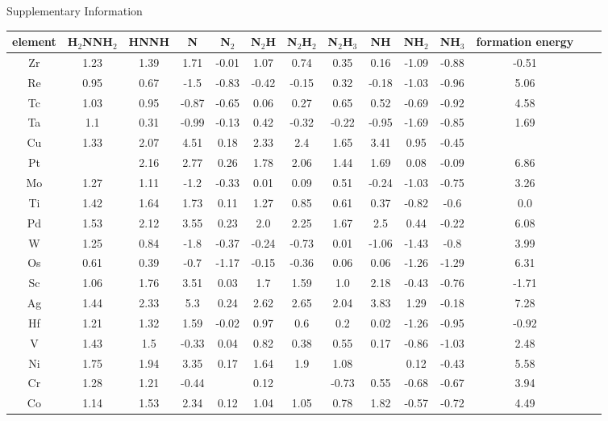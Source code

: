 Supplementary Information
\onecolumn
\begin{center}
\begin{tabular}{| c | c | c | c | c | c | c | c | c | c | c | c | c | c |}
\hline
element & H$_2$NNH$_2$ & HNNH & N & N$_2$ & N$_2$H & N$_2$H$_2$ & N$_2$H$_3$ & NH & NH$_2$ & NH$_3$ & formation energy\\
\hline

Zr & 1.23 & 1.39 & 1.71 & -0.01 & 1.07 & 0.74 & 0.35 & 0.16 & -1.09 & -0.88 & -0.51 \\
Re & 0.95 & 0.67 & -1.5 & -0.83 & -0.42 & -0.15 & 0.32 & -0.18 & -1.03 & -0.96 & 5.06 \\
Tc & 1.03 & 0.95 & -0.87 & -0.65 & 0.06 & 0.27 & 0.65 & 0.52 & -0.69 & -0.92 & 4.58 \\
Ta & 1.1 & 0.31 & -0.99 & -0.13 & 0.42 & -0.32 & -0.22 & -0.95 & -1.69 & -0.85 & 1.69 \\
Cu & 1.33 & 2.07 & 4.51 & 0.18 & 2.33 & 2.4 & 1.65 & 3.41 & 0.95 & -0.45 &  \\
Pt &  & 2.16 & 2.77 & 0.26 & 1.78 & 2.06 & 1.44 & 1.69 & 0.08 & -0.09 & 6.86 \\
Mo & 1.27 & 1.11 & -1.2 & -0.33 & 0.01 & 0.09 & 0.51 & -0.24 & -1.03 & -0.75 & 3.26 \\
Ti & 1.42 & 1.64 & 1.73 & 0.11 & 1.27 & 0.85 & 0.61 & 0.37 & -0.82 & -0.6 & 0.0 \\
Pd & 1.53 & 2.12 & 3.55 & 0.23 & 2.0 & 2.25 & 1.67 & 2.5 & 0.44 & -0.22 & 6.08 \\
W & 1.25 & 0.84 & -1.8 & -0.37 & -0.24 & -0.73 & 0.01 & -1.06 & -1.43 & -0.8 & 3.99 \\
Os & 0.61 & 0.39 & -0.7 & -1.17 & -0.15 & -0.36 & 0.06 & 0.06 & -1.26 & -1.29 & 6.31 \\
Sc & 1.06 & 1.76 & 3.51 & 0.03 & 1.7 & 1.59 & 1.0 & 2.18 & -0.43 & -0.76 & -1.71 \\
Ag & 1.44 & 2.33 & 5.3 & 0.24 & 2.62 & 2.65 & 2.04 & 3.83 & 1.29 & -0.18 & 7.28 \\
Hf & 1.21 & 1.32 & 1.59 & -0.02 & 0.97 & 0.6 & 0.2 & 0.02 & -1.26 & -0.95 & -0.92 \\
V & 1.43 & 1.5 & -0.33 & 0.04 & 0.82 & 0.38 & 0.55 & 0.17 & -0.86 & -1.03 & 2.48 \\
Ni & 1.75 & 1.94 & 3.35 & 0.17 & 1.64 & 1.9 & 1.08 &  & 0.12 & -0.43 & 5.58 \\
Cr & 1.28 & 1.21 & -0.44 &  & 0.12 &  & -0.73 & 0.55 & -0.68 & -0.67 & 3.94 \\
Co & 1.14 & 1.53 & 2.34 & 0.12 & 1.04 & 1.05 & 0.78 & 1.82 & -0.57 & -0.72 & 4.49 \\

\end{tabular}
\end{center}
